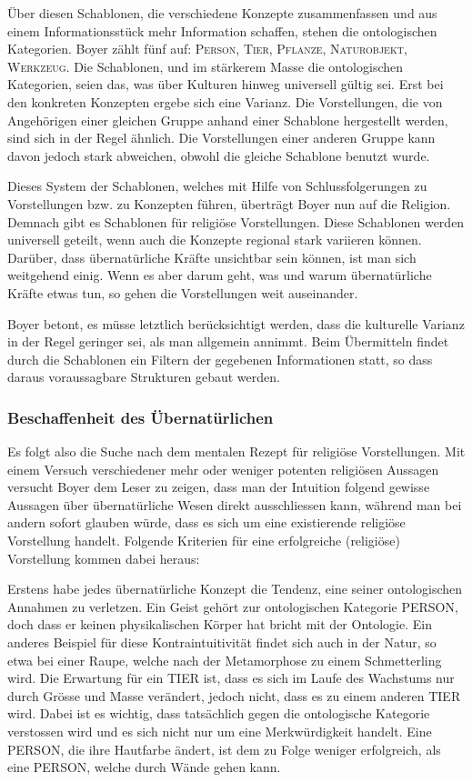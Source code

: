 Über diesen Schablonen, die verschiedene Konzepte zusammenfassen und aus einem Informationsstück mehr Information schaffen, stehen die ontologischen Kategorien. Boyer zählt fünf auf: \textsc{Person, Tier, Pflanze, Naturobjekt, Werkzeug}. Die Schablonen, und im stärkerem Masse die ontologischen Kategorien, seien das, was über Kulturen hinweg universell gültig sei. Erst bei den konkreten Konzepten ergebe sich eine Varianz. Die Vorstellungen, die von Angehörigen einer gleichen Gruppe anhand einer Schablone hergestellt werden, sind sich in der Regel ähnlich. Die Vorstellungen einer anderen Gruppe kann davon jedoch stark abweichen, obwohl die gleiche Schablone benutzt wurde. 

Dieses System der Schablonen, welches mit Hilfe von Schlussfolgerungen zu Vorstellungen bzw. zu Konzepten führen, überträgt Boyer nun auf die Religion. Demnach gibt es Schablonen für religiöse Vorstellungen. Diese Schablonen werden universell geteilt, wenn auch die Konzepte regional stark variieren können. Darüber, dass übernatürliche Kräfte unsichtbar sein können, ist man sich weitgehend einig. Wenn es aber darum geht, was und warum übernatürliche Kräfte etwas tun, so gehen die Vorstellungen weit auseinander. 

Boyer betont, es müsse letztlich berücksichtigt werden, dass die kulturelle Varianz in der Regel geringer sei, als man allgemein annimmt. Beim Übermitteln findet durch die Schablonen ein Filtern der gegebenen Informationen statt, so dass daraus voraussagbare Strukturen gebaut werden.\todo{[65]}

\subsubsection{Beschaffenheit des Übernatürlichen}
Es folgt also die Suche nach dem mentalen Rezept für religiöse Vorstellungen. Mit einem Versuch verschiedener mehr oder weniger potenten religiösen Aussagen versucht Boyer dem Leser zu zeigen, dass man der Intuition folgend gewisse Aussagen über übernatürliche Wesen direkt ausschliessen kann, während man bei andern sofort glauben würde, dass es sich um eine existierende religiöse Vorstellung handelt. Folgende Kriterien für eine erfolgreiche (religiöse) Vorstellung kommen dabei heraus: 

Erstens habe jedes übernatürliche Konzept die Tendenz, eine seiner ontologischen Annahmen zu verletzen. Ein Geist gehört zur ontologischen Kategorie PERSON, doch dass er keinen physikalischen Körper hat bricht mit der Ontologie. Ein anderes Beispiel für diese Kontraintuitivität findet sich auch in der Natur, so etwa bei einer Raupe, welche nach der Metamorphose zu einem Schmetterling wird. Die Erwartung für ein TIER ist, dass es sich im Laufe des Wachstums nur durch Grösse und Masse verändert, jedoch nicht, dass es zu einem anderen TIER wird. Dabei ist es wichtig, dass tatsächlich gegen die ontologische Kategorie verstossen wird und es sich nicht nur um eine Merkwürdigkeit handelt. Eine PERSON, die ihre Hautfarbe ändert, ist dem zu Folge weniger erfolgreich, als eine PERSON, welche durch Wände gehen kann. 

